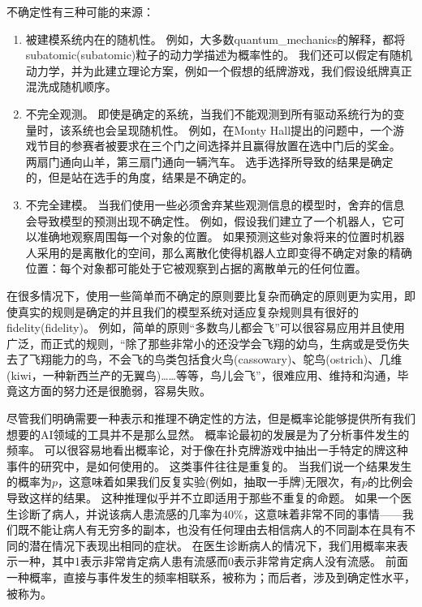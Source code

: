 不确定性有三种可能的来源：

\begin{enumerate}
\item 被建模系统内在的随机性。
例如，大多数\gls{quantum_mechanics}的解释，都将\gls{subatomic}(subatomic)粒子的动力学描述为概率性的。
我们还可以假定有随机动力学，并为此建立理论方案，例如一个假想的纸牌游戏，我们假设纸牌真正混洗成随机顺序。

\item 不完全观测。
即使是确定的系统，当我们不能观测到所有驱动系统行为的变量时，该系统也会呈现随机性。
例如，在Monty Hall提出的问题中，一个游戏节目的参赛者被要求在三个门之间选择并且赢得放置在选中门后的奖金。
两扇门通向山羊，第三扇门通向一辆汽车。
选手选择所导致的结果是确定的，但是站在选手的角度，结果是不确定的。

\item 不完全建模。
当我们使用一些必须舍弃某些观测信息的模型时，舍弃的信息会导致模型的预测出现不确定性。
例如，假设我们建立了一个机器人，它可以准确地观察周围每一个对象的位置。
如果预测这些对象将来的位置时机器人采用的是离散化的空间，那么离散化使得机器人立即变得不确定对象的精确位置：每个对象都可能处于它被观察到占据的离散单元的任何位置。
\end{enumerate}


在很多情况下，使用一些简单而不确定的原则要比复杂而确定的原则更为实用，即使真实的规则是确定的并且我们的模型系统对适应复杂规则具有很好的\gls{fidelity}(fidelity)。
例如，简单的原则``多数鸟儿都会飞''可以很容易应用并且使用广泛，而正式的规则，``除了那些非常小的还没学会飞翔的幼鸟，生病或是受伤失去了飞翔能力的鸟，不会飞的鸟类包括食火鸟(cassowary)、鸵鸟(ostrich)、几维(kiwi，一种新西兰产的无翼鸟)……等等，鸟儿会飞''，很难应用、维持和沟通，毕竟这方面的努力还是很脆弱，容易失败。

尽管我们明确需要一种表示和推理不确定性的方法，但是概率论能够提供所有我们想要的\gls{AI}领域的工具并不是那么显然。
概率论最初的发展是为了分析事件发生的频率。
可以很容易地看出概率论，对于像在扑克牌游戏中抽出一手特定的牌这种事件的研究中，是如何使用的。
这类事件往往是重复的。
当我们说一个结果发生的概率为$p$，这意味着如果我们反复实验(例如，抽取一手牌)无限次，有$p$的比例会导致这样的结果。
这种推理似乎并不立即适用于那些不重复的命题。
如果一个医生诊断了病人，并说该病人患流感的几率为40\%，这意味着非常不同的事情——我们既不能让病人有无穷多的副本，也没有任何理由去相信病人的不同副本在具有不同的潜在情况下表现出相同的症状。
在医生诊断病人的情况下，我们用概率来表示一种，其中1表示非常肯定病人患有流感而0表示非常肯定病人没有流感。
前面一种概率，直接与事件发生的频率相联系，被称为；而后者，涉及到确定性水平，被称为。

